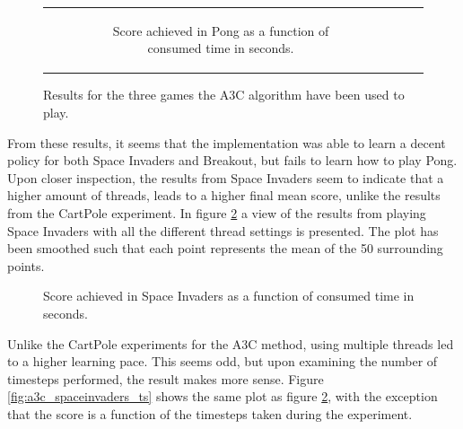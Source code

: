 \documentclass[11pt]{article}
\begin{document}
\begin{figure}[H]
\begin{tabular}[c]{ccc}
\begin{subfigure}[t]{.32\textwidth}
        \caption{Score achieved in Pong as a function of
        consumed time in seconds.}
    \end{subfigure}
  \end{tabular}
  \caption{Results for the three games the A3C algorithm have been used to play.}
  \label{fig:all_atari}
\end{figure}

From these results, it seems that the implementation was able to learn
a decent policy for both Space Invaders and Breakout, but fails
to learn how to play Pong.
Upon closer inspection, the results from Space Invaders seem to indicate 
that a higher amount of threads, leads to a higher final mean score,
unlike the results from the CartPole experiment.
In figure \ref{fig:a3c_spaceinvaders} a view of the results from
playing Space Invaders with all the different thread settings is presented.
The plot has been smoothed such that each point represents the mean of the
50 surrounding points.

\begin{figure}[H]
    \caption{Score achieved in Space Invaders as a function of
    consumed time in seconds.}
    \label{fig:a3c_spaceinvaders}
\end{figure}

Unlike the CartPole experiments for the A3C method, using multiple threads
led to a higher learning pace.
This seems odd, but upon examining the number of timesteps performed,
the result makes more sense.
Figure \ref{fig:a3c_spaceinvaders_ts} shows the same plot as
figure \ref{fig:a3c_spaceinvaders}, with the
exception that the score is a function of the timesteps taken
during the experiment.
\end{document}
